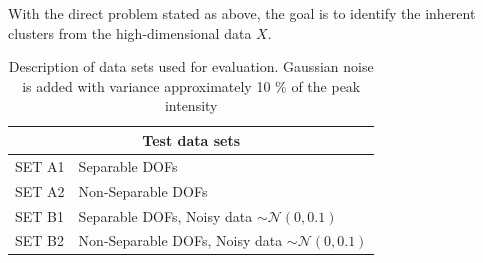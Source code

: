 With the direct problem stated as above, the goal is to identify the inherent clusters from the high-dimensional data $X$.

\begin{table}[h]
     \centering
\begin{tabular}{ |l|l| }
  \hline
  \multicolumn{2}{|c|}{Test data sets} \\
  \hline
  SET A1 & Separable DOFs \\
  SET A2 & Non-Separable DOFs \\
  SET B1 & Separable DOFs, Noisy data $\sim \mathcal{N}(0,0.1)$ \\
  SET B2 & Non-Separable DOFs, Noisy data $\sim \mathcal{N}(0,0.1)$ \\
  \hline
\end{tabular}
    \captionsetup{justification=centering}
     \caption{Description of data sets used for evaluation. Gaussian noise is added with variance approximately 10 \% of the peak intensity}
     \label{datasets}
 \end{table}
 
